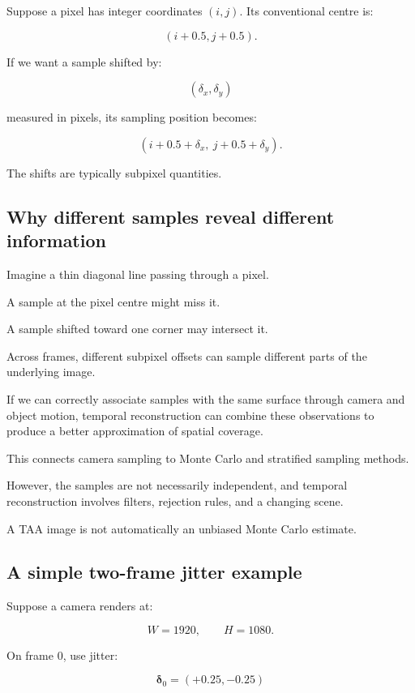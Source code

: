 Suppose a pixel has integer coordinates \((i,j)\). Its conventional centre is:

\[
 (i+0.5,j+0.5).
\]

If we want a sample shifted by:

\[
 (\delta_x,\delta_y)
\]

measured in pixels, its sampling position becomes:

\[
 \boxed{ (i+0.5+\delta_x,\ j+0.5+\delta_y) }.
\]

The shifts are typically subpixel quantities.

\subsection{Why different samples reveal different information}\label{02-foundations-ii-ch036-why-different-samples-reveal-different-information}

Imagine a thin diagonal line passing through a pixel.

A sample at the pixel centre might miss it.

A sample shifted toward one corner may intersect it.

Across frames, different subpixel offsets can sample different parts of the underlying image.

If we can correctly associate samples with the same surface through camera and object motion, temporal reconstruction can combine these observations to produce a better approximation of spatial coverage.

This connects camera sampling to Monte Carlo and stratified sampling methods.

However, the samples are not necessarily independent, and temporal reconstruction involves filters, rejection rules, and a changing scene.

A TAA image is not automatically an unbiased Monte Carlo estimate.

\subsection{A simple two-frame jitter example}\label{02-foundations-ii-ch036-a-simple-two-frame-jitter-example}

Suppose a camera renders at:

\[
 W=1920,\qquad H=1080.
\]

On frame 0, use jitter:

\[
 \boldsymbol\delta_0=(+0.25,-0.25)
\]

